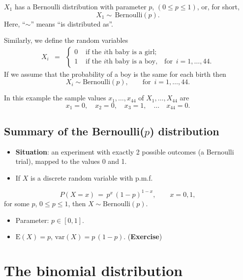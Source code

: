 \documentclass[
  british,
  11pt,
  openany, a4paper]{book}
\providecommand{\tightlist}{%
  \setlength{\itemsep}{0pt}\setlength{\parskip}{0pt}}
\begin{document}
\(X_1\) has a Bernoulli distribution with parameter \(p\), \((0 \leq p \leq 1)\), or, for short,
\[ X_1 \sim
\,\text{Bernoulli}(p). 
\]
Here, ``\(\sim\)'' means ``is distributed as''.

Similarly, we define the random variables
\begin{eqnarray*}
X_i &=& \left\{ \begin{array}{ll}0&\text{  if the }i\text{th baby is a girl}; \\
                                 1&\text{  if the }i\text{th baby is a boy,} \quad\text{for}\,\,\,i=1,\ldots,44.\end{array}\right.
\end{eqnarray*}
If we assume that the probability of a boy is the same for each birth then
\[ X_i \sim \text{Bernoulli}(p), \qquad \text{for}\,\,\,i=1,\ldots,44. \]

In this example the sample values \(x_1, \ldots, x_{44}\) of \(X_1,\ldots,X_{44}\) are
\[ x_1=0, \quad x_2=0, \quad x_3=1, \quad \ldots \quad x_{44}=0. \]

\subsection{\texorpdfstring{Summary of the Bernoulli(\(p\)) distribution}{Summary of the Bernoulli(p) distribution}}\label{summary-of-the-bernoullip-distribution}

\begin{itemize}
\tightlist
\item
  \textbf{Situation}: an experiment with exactly 2 possible outcomes (a Bernoulli trial), mapped to the values 0 and 1.
\item
  If \(X\) is a discrete random variable with p.m.f.
\end{itemize}

\[ P(X=x) \,=\, p^x\,(1-p)^{1-x}, \qquad x=0,1, \]
for some \(p\), \(0 \leq p \leq 1\), then \(X \sim \text{Bernoulli}(p)\).

\begin{itemize}
\tightlist
\item
  Parameter: \(p \in [0,1]\).
\item
  \(\text{E}(X)=p\), \(\text{var}(X)=p\,(1-p)\). (\textbf{Exercise})
\end{itemize}

\section{The binomial distribution}\label{binomial}
\end{document}
